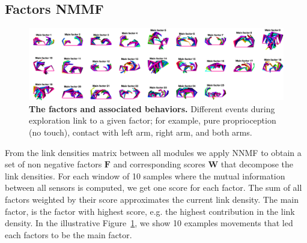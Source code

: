 \subsection{Factors NMMF}
\begin{figure}[!t]
	\begin{center}
		\hspace*{\fill}
		\includegraphics[height=0.3\linewidth]{fig/movement_mainfactors_horizontal.png}
		\hspace*{\fill}
	\end{center}
	\caption{\textbf{The factors and associated behaviors.} Different events during exploration link to a given factor; for example, pure proprioception (no touch), contact with left arm, right arm, and both arms.}
    \label{fig:main_factors}
\end{figure}
From the link densities matrix between all modules we apply NNMF to obtain a set of non negative factors $\mathbf{F}$ and corresponding scores $\mathbf{W}$ that decompose the link densities.
For each window of 10 samples where the mutual information between all sensors is computed, we get one score for each factor. The sum of all factors weighted by their score approximates the current link density. The main factor, is the factor with highest score, e.g. the highest contribution in the link density.  In the illustrative Figure~\ref{fig:main_factors}, we show 10 examples movements that led each  factors to be the main factor.%
